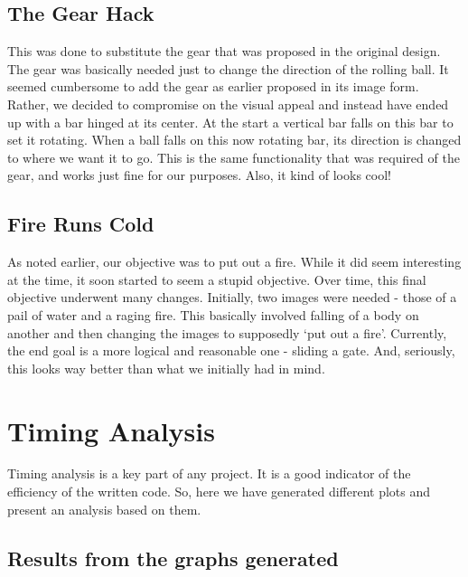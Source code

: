 \documentclass[a4paper,11pt]{article}
\begin{document}
\subsection{The Gear Hack}

This was done to substitute the gear that was proposed in the original design. The gear was basically needed just to change the direction of the rolling ball. It seemed cumbersome to add the gear as earlier proposed in its image form. Rather, we decided to compromise on the visual appeal and instead have ended up with a bar hinged at its center. At the start a vertical bar falls on this bar to set it rotating.  When a ball falls on this now rotating bar, its direction is changed to where we want it to go. This is the same functionality that was required of the gear, and works just fine for our purposes. Also, it kind of looks cool!

\subsection{Fire Runs Cold}

As noted earlier, our objective was to put out a fire. While it did seem interesting at the time, it soon started to seem a stupid objective. Over time, this final objective underwent many changes. Initially, two images were needed - those of a pail of water and a raging fire. This basically involved falling of a body on another and then changing the images to supposedly `put out a fire'. Currently, the end goal is a more logical and reasonable one - sliding a gate. And, seriously, this looks way better than what we initially had in mind.

\section{Timing Analysis}

Timing analysis is a key part of any project. It is a good indicator of the efficiency of the written code. So, here we have generated 
different plots and present an analysis based on them.

\subsection{Results from the graphs generated}
\end{document}
